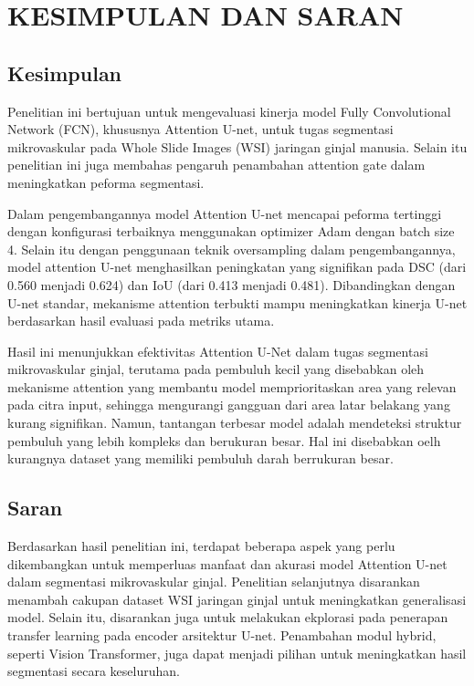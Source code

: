 \chapter{KESIMPULAN DAN SARAN}

\section{Kesimpulan}
\noindent Penelitian ini bertujuan untuk mengevaluasi kinerja model Fully Convolutional Network (FCN), khususnya Attention U-net, untuk tugas segmentasi mikrovaskular pada Whole Slide Images (WSI) jaringan ginjal manusia. Selain itu penelitian ini juga membahas pengaruh penambahan attention gate dalam meningkatkan peforma segmentasi.

\noindent Dalam pengembangannya model Attention U-net mencapai peforma tertinggi dengan konfigurasi terbaiknya menggunakan optimizer Adam dengan batch size 4. Selain itu dengan penggunaan teknik oversampling dalam pengembangannya, model attention U-net menghasilkan peningkatan yang signifikan pada DSC (dari 0.560 menjadi 0.624) dan IoU (dari 0.413 menjadi 0.481).  Dibandingkan dengan U-net standar, mekanisme attention terbukti mampu meningkatkan kinerja U-net berdasarkan hasil evaluasi pada metriks utama.

\noindent Hasil ini menunjukkan efektivitas Attention U-Net dalam tugas segmentasi mikrovaskular ginjal, terutama pada pembuluh kecil yang disebabkan oleh mekanisme attention yang membantu model memprioritaskan area yang relevan pada citra input, sehingga mengurangi gangguan dari area latar belakang yang kurang signifikan. Namun, tantangan terbesar model adalah mendeteksi struktur pembuluh yang lebih kompleks dan berukuran besar. Hal ini disebabkan oelh kurangnya dataset yang memiliki pembuluh darah berrukuran besar.

\section{Saran}

Berdasarkan hasil penelitian ini, terdapat beberapa aspek yang perlu dikembangkan untuk memperluas manfaat dan akurasi model Attention U-net dalam segmentasi mikrovaskular ginjal. Penelitian selanjutnya disarankan menambah cakupan dataset WSI jaringan ginjal untuk meningkatkan generalisasi model. Selain itu, disarankan juga untuk melakukan ekplorasi pada penerapan transfer learning pada encoder arsitektur U-net. Penambahan modul hybrid, seperti Vision Transformer, juga dapat menjadi pilihan untuk meningkatkan hasil segmentasi secara keseluruhan.

